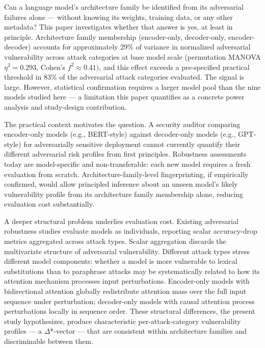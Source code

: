 
Can a language model's architecture family be identified from its adversarial failures alone --- without knowing its weights, training data, or any other metadata? This paper investigates whether that answer is yes, at least in principle. Architecture family membership (encoder-only, decoder-only, encoder-decoder) accounts for approximately 29\% of variance in normalized adversarial vulnerability across attack categories at base model scale (permutation MANOVA $\eta^{2}=0.293$, Cohen's $f^{2}\approx 0.41)$, and this effect exceeds a pre-specified practical threshold in 83\% of the adversarial attack categories evaluated. The signal is large. However, statistical confirmation requires a larger model pool than the nine models studied here --- a limitation this paper quantifies as a concrete power analysis and study-design contribution.

The practical context motivates the question. A security auditor comparing encoder-only models (e.g., BERT-style) against decoder-only models (e.g., GPT-style) for adversarially sensitive deployment cannot currently quantify their different adversarial risk profiles from first principles. Robustness assessments today are model-specific and non-transferable: each new model requires a fresh evaluation from scratch. Architecture-family-level fingerprinting, if empirically confirmed, would allow principled inference about an unseen model's likely vulnerability profile from its architecture family membership alone, reducing evaluation cost substantially.

A deeper structural problem underlies evaluation cost. Existing adversarial robustness studies evaluate models as individuals, reporting scalar accuracy-drop metrics aggregated across attack types. Scalar aggregation discards the multivariate structure of adversarial vulnerability. Different attack types stress different model components: whether a model is more vulnerable to lexical substitutions than to paraphrase attacks may be systematically related to how its attention mechanism processes input perturbations. Encoder-only models with bidirectional attention globally redistribute attention mass over the full input sequence under perturbation; decoder-only models with causal attention process perturbations locally in sequence order. These structural differences, the present study hypothesizes, produce characteristic per-attack-category vulnerability profiles --- a $\Delta$*-vector --- that are consistent within architecture families and discriminable between them.

